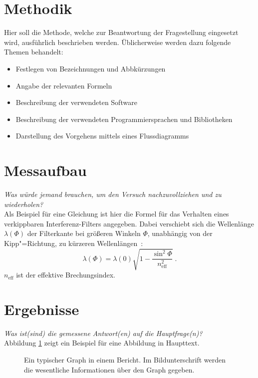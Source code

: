 \documentclass[12pt,a4paper]{scrartcl}
\begin{document}
%
\newpage
\section{Methodik}\label{sec:Methodik}
%
Hier soll die Methode, welche zur Beantwortung der Fragestellung eingesetzt wird, ausführlich beschrieben werden.
Üblicherweise werden dazu folgende Themen behandelt:
%
\begin{itemize}
\item Festlegen von Bezeichnungen und Abbkürzungen 
\item Angabe der relevanten Formeln 
\item Beschreibung der verwendeten Software 
\item Beschreibung der verwendeten Programmiersprachen und Bibliotheken
\item Darstellung des Vorgehens mittels eines Flussdiagramms
\end{itemize}
%
%
\newpage
\section{Messaufbau}\label{sec:ExpAufb}
%
\textit{Was würde jemand brauchen, um den Versuch nachzuvollziehen und zu wiederholen?}\\
Als Beispiel für eine Gleichung ist hier die Formel für das Verhalten eines verkippbaren Interferenz-Filters angegeben. Dabei verschiebt sich die Wellenlänge $\lambda\left(\Phi\right)$ der Filterkante bei größeren Winkeln $\Phi$, unabhängig von der Kipp"=Richtung, zu kürzeren Wellenlängen~\cite{TiltFilter}:
\begin{equation}
\lambda\left(\Phi\right)=\lambda\left(0\right)\sqrt{1-\frac{\sin^2\Phi}{n_\text{eff}^2}}\;.
\label{eq:TiltWel}
\end{equation}
$n_\text{eff}$ ist der effektive Brechungsindex.
%
\newpage
\section{Ergebnisse}
\label{sec:Ergebnisse}
%
\textit{Was ist(sind) die gemessene Antwort(en) auf die Hauptfrage(n)?}\\
Abbildung \ref{fig:examplfig} zeigt ein Beispiel für eine Abbildung in Haupttext.
\begin{figure}[htb!]
 \centering
 \caption{\label{fig:examplfig}Ein typischer Graph in einem Bericht. Im Bildunterschrift werden die wesentliche Informationen über den Graph gegeben.
 }
\end{figure}
%
\end{document}
